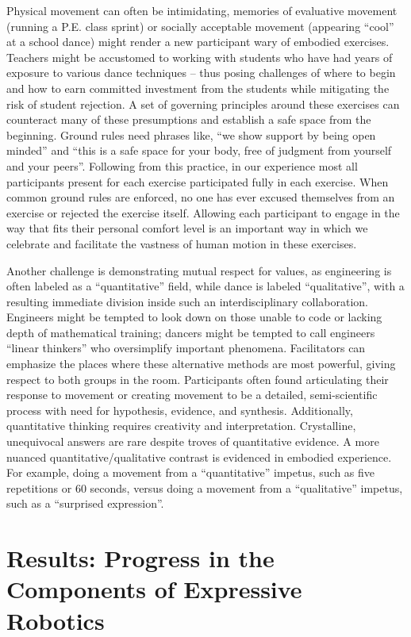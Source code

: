 \documentclass[arts,article,submit,moreauthors,pdftex,10pt,a4paper]{mdpi}
\begin{document}
Physical movement can often be intimidating, memories of evaluative movement (running a P.E. class sprint) or socially acceptable movement (appearing ``cool'' at a school dance) might render a new participant wary of embodied exercises.  Teachers might be accustomed to working with students who have had years of exposure to various dance techniques -- thus posing challenges of where to begin and how to earn committed investment from the students while mitigating the risk of student rejection.  A set of governing principles around these exercises can counteract many of these presumptions and establish a safe space from the beginning.  Ground rules need phrases like, ``we show support by being open minded'' and ``this is a safe space for your body, free of judgment from yourself and your peers''.  Following from this practice, in our experience most all participants present for each exercise participated fully in each exercise.  When common ground rules are enforced, no one has ever excused themselves from an exercise or rejected the exercise itself.  Allowing each participant to engage in the way that fits their personal comfort level is an important way in which we celebrate and facilitate the vastness of human motion in these exercises.

Another challenge is demonstrating mutual respect for values, as engineering is often labeled as a ``quantitative'' field, while dance is labeled ``qualitative'', with a resulting immediate division inside such an interdisciplinary collaboration.  Engineers might be tempted to look down on those unable to code or lacking depth of mathematical training; dancers might be tempted to call engineers ``linear thinkers'' who oversimplify important phenomena.  Facilitators can emphasize the places where these alternative methods are most powerful, giving respect to both groups in the room.  Participants often found articulating their response to movement or creating movement to be a detailed, semi-scientific process with need for hypothesis, evidence, and synthesis.  Additionally, quantitative thinking requires creativity and interpretation.  Crystalline, unequivocal answers are rare despite troves of quantitative evidence.  A more nuanced quantitative/qualitative contrast is evidenced in embodied experience.  For example, doing a movement from a ``quantitative''
 impetus, such as five repetitions or 60 seconds, versus doing a movement from a ``qualitative'' impetus, such as a ``surprised expression''.  


\section{Results: Progress in the Components of Expressive Robotics}
\end{document}
